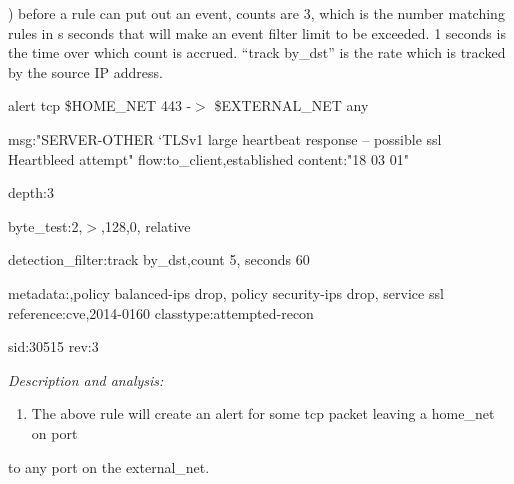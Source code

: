 \documentclass{article} %
\begin{document}
\noindent ) before a rule can put out an event, counts are 3, which is the number matching rules in s seconds that will make an event filter limit to be exceeded. 1 seconds is the time over which count is accrued. ``track by\_dst'' is the rate which is tracked by the source IP address.

\noindent 

\noindent alert tcp \$HOME\_NET 443 -$>$ \$EXTERNAL\_NET any

\noindent msg:"SERVER-OTHER `TLSv1 large heartbeat response -- possible ssl Heartbleed attempt" flow:to\_client,established content:"{\textbar}18 03 01{\textbar}"

\noindent depth:3

\noindent byte\_test:2,$>$,128,0, relative 

\noindent detection\_filter:track by\_dst,count 5, seconds 60

\noindent metadata:,policy balanced-ips drop, policy security-ips drop, service ssl reference:cve,2014-0160 classtype:attempted-recon 

\noindent sid:30515 rev:3

\noindent \textit{Description and analysis:}

\begin{enumerate}
\item  The above rule will create an alert for some tcp packet leaving a home\_net on port 
\end{enumerate}

 to any port on the external\_net.
\end{document}
